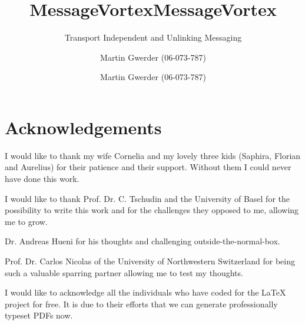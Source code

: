 \documentclass[a4paper,appendixprefix,pdfusetitle,twocolumn,fontsize=8pt,attachdocs,draft,status=draft]{scrbook}
\title{MessageVortex}
\subtitle{\thesubtitle}
\author{Martin Gwerder (06-073-787)}
\title{MessageVortex}
\subtitle{Transport Independent and Unlinking Messaging}
\author{Martin Gwerder (06-073-787)}
\date{\gitAuthorDate}
\begin{document}
%
%
\frontmatter%
%

%


\section*{Acknowledgements}
\begin{acknowledgements}      %
I would like to thank my wife Cornelia and my lovely three kids (Saphira, Florian and Aurelius) for their patience and their support. Without them I could never have done this work.\par

I would like to thank Prof. Dr. C. Tschudin and the University of Basel for the possibility to write this work and for the challenges they opposed to me, allowing me to grow. 

Dr. Andreas Hueni for his thoughts and challenging outside-the-normal-box.

Prof. Dr. Carlos Nicolas of the University of Northwestern Switzerland for being such a valuable sparring partner allowing me to test my thoughts.

I would like to acknowledge all the individuals who have coded for the LaTeX project for free. It is due to their efforts that we can generate professionally typeset PDFs now.
\end{acknowledgements}

\cleardoublepage
\makeatletter
\renewcommand{\l@subsubsection}{\@dottedtocline{3}{7.4em}{4.5em}}
\renewcommand{\@pnumwidth}{3em}
\makeatother

\onecolumn
\setcounter{tocdepth}{2}
\tableofcontents
\indexes
\twocolumn
\mainmatter







\onecolumn
\appendix
{}%
\renewcommand*{\thepage}{A\arabic{page}}
\end{document}
